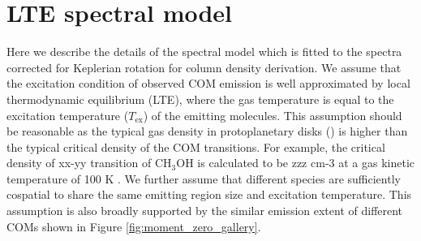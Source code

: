 \documentclass[twocolumn, twocolappendix, astrosymb, times]{aastex631}
\newcommand{\methanol}{CH$_3$OH\xspace}
\begin{document}
\section{LTE spectral model}\label{appendix:spectral_model}
Here we describe the details of the spectral model which is fitted to the spectra corrected for Keplerian rotation for column density derivation. We assume that the excitation condition of observed COM emission is well approximated by local thermodynamic equilibrium (LTE), where the gas temperature is equal to the excitation temperature ($T_\mathrm{ex}$) of the emitting molecules. This assumption should be reasonable as the typical gas density in protoplanetary disks () is higher than the typical critical density of the COM transitions. For example, the critical density of xx-yy transition of \methanol is calculated to be zzz cm-3 at a gas kinetic temperature of 100 K \citep[ref][]{}. We further assume that different species are sufficiently cospatial to share the same emitting region size and excitation temperature. This assumption is also broadly supported by the similar emission extent of different COMs shown in Figure \ref{fig:moment_zero_gallery}. 
\end{document}
